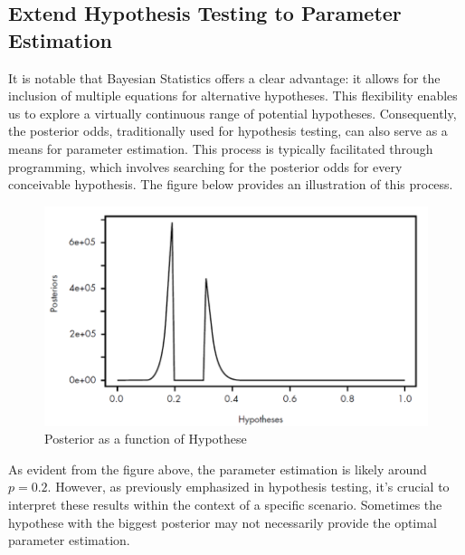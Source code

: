 \documentclass{article}
\begin{document}
\subsection{Extend Hypothesis Testing to Parameter Estimation}
It is notable that Bayesian Statistics offers a clear advantage: it allows for the inclusion of multiple equations for alternative hypotheses. This flexibility enables us to explore a virtually continuous range of potential hypotheses. Consequently, the posterior odds, traditionally used for hypothesis testing, can also serve as a means for parameter estimation. This process is typically facilitated through programming, which involves searching for the posterior odds for every conceivable hypothesis. The figure below provides an illustration of this process.
\begin{figure}[!htbp]
    \centering
    \includegraphics{Picture3.png}
    \caption{Posterior as a function of Hypothese}
    \label{fig:enter-label}
\end{figure}
\FloatBarrier
As evident from the figure above, the parameter estimation is likely around $p=0.2$. However, as previously emphasized in hypothesis testing, it's crucial to interpret these results within the context of a specific scenario. Sometimes the hypothese with the biggest posterior may not necessarily provide the optimal parameter estimation.
\end{document}
